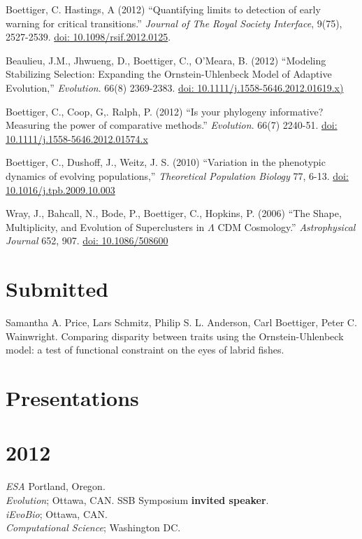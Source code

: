 \documentclass[margin]{res}
\begin{document}
\begin{resume}
Boettiger, C. Hastings, A (2012) ``Quantifying limits to detection of early warning for critical transitions.'' {\it Journal of The Royal Society Interface},  9(75), 2527-2539. \href{http://dx.doi.org/10.1098/rsif.2012.0125}{doi: 10.1098/rsif.2012.0125}.

Beaulieu, J.M., Jhwueng, D., Boettiger, C., O'Meara, B. (2012) ``Modeling Stabilizing Selection: Expanding the Ornstein-Uhlenbeck Model of Adaptive Evolution,'' {\it Evolution}. 66(8) 2369-2383. \href{http://dx.doi.org/10.1111/j.1558-5646.2012.01619.x}{doi: 10.1111/j.1558-5646.2012.01619.x)}

Boettiger, C., Coop, G,. Ralph, P. (2012) ``Is your phylogeny informative? Measuring the power of comparative methods.'' {\it Evolution}. 66(7) 2240-51. \href{http://dx.doi.org/10.1111/j.1558-5646.2012.01574.x}{doi: 10.1111/j.1558-5646.2012.01574.x}

Boettiger, C., Dushoff, J., Weitz, J. S. (2010) ``Variation in the phenotypic dynamics of evolving populations,'' {\it Theoretical Population Biology} 77, 6-13. \href{http://dx.doi.org/10.1016/j.tpb.2009.10.003}{doi: 10.1016/j.tpb.2009.10.003}

Wray, J., Bahcall, N., Bode, P., Boettiger, C., Hopkins, P.  (2006)  ``The Shape, Multiplicity, and Evolution of Superclusters in $\Lambda$ CDM Cosmology.''  {\it Astrophysical Journal} 652, 907. \href{http://dx.doi.org/10.1086/508600}{doi: 10.1086/508600}

\section{\textnormal{Submitted}}

Samantha A. Price, Lars Schmitz, Philip S. L. Anderson, Carl Boettiger, Peter C. Wainwright. Comparing disparity between traits using the Ornstein-Uhlenbeck model: a test of functional constraint on the eyes of labrid fishes.

\section{Presentations} 

\section{\textnormal{2012}}
  \emph{ESA} Portland, Oregon. \\ 
  \emph{Evolution}; Ottawa, CAN. SSB Symposium \textbf{invited speaker}.\\
  \emph{iEvoBio}; Ottawa, CAN. \\
  \emph{Computational Science}; Washington DC. 

\end{resume}
\end{document}
